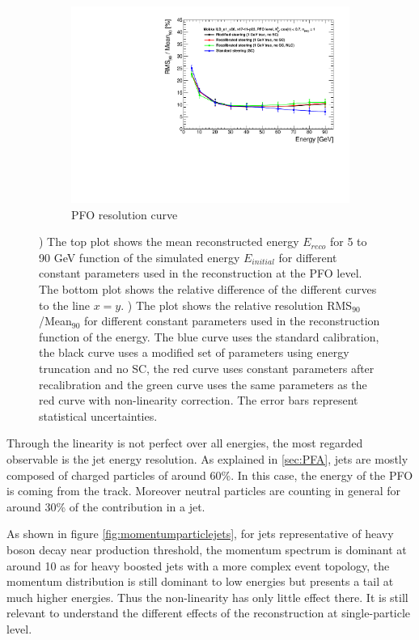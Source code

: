 \begin{figure}[htbp!]
\begin{subfigure}[t]{0.45\textwidth}
    \includegraphics[width=1\linewidth]{../Thesis_Plots/ILD/NoSmearing/Plots_Comparison/Comparison_resolution_Curves_PFO}
    \caption{PFO resolution curve} \label{fig:resopfo}
  \end{subfigure}
  \caption{) The top plot shows the mean reconstructed energy $E_{reco}$ for 5 to 90 GeV \kzeroL{} function of the simulated energy $E_{initial}$ for different constant parameters used in the reconstruction at the PFO level. The bottom plot shows the relative difference of the different curves to the line $x = y$. ) The plot shows the relative resolution RMS$_{90}$/Mean$_{90}$ for different constant parameters used in the reconstruction function of the energy. The blue curve uses the standard calibration, the black curve uses a modified set of parameters using energy truncation and no SC, the red curve uses constant parameters after recalibration and the green curve uses the same parameters as the red curve with non-linearity correction. The error bars represent statistical uncertainties.}
\end{figure}

Through the linearity is not perfect over all energies, the most regarded observable is the jet energy resolution. As explained in \ref{sec:PFA}, jets are mostly composed of charged particles of around 60\%. In this case, the energy of the PFO is coming from the track. Moreover neutral particles are counting in general for around 30\% of the contribution in a jet.

As shown in figure \ref{fig:momentumparticlejets}, for jets representative of heavy boson decay near production threshold, the momentum spectrum is dominant at around 10 \GeV as for heavy boosted jets with a more complex event topology, the momentum distribution is still dominant to low energies but presents a tail at much higher energies. Thus the non-linearity has only little effect there. It is still relevant to understand the different effects of the reconstruction at single-particle level.

